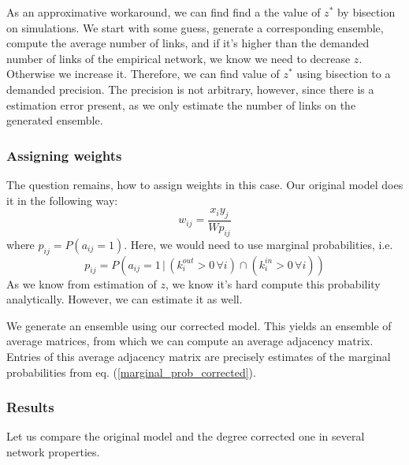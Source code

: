 \documentclass{article}
\begin{document}
As an approximative workaround, we can find find a the value of $z^*$ by bisection on simulations. We start with some guess, generate a corresponding ensemble, compute the average number of links, and if it's higher than the demanded number of links of the empirical network, we know we need to decrease $z$. Otherwise we increase it. Therefore, we can find value of $z^*$ using bisection to a demanded precision. The precision is not arbitrary, however, since there is a estimation error present, as we only estimate the number of links on the generated ensemble.

\subsubsection{Assigning weights}
The question remains, how to assign weights in this case. Our original model does it in the following way:
\begin{equation}
    w_{ij} = \frac{x_iy_j}{Wp_{ij}}
\end{equation}
where $p_{ij} = P(a_{ij} = 1)$. Here, we would need to use marginal probabilities, i.e. 
\begin{equation}
    p_{ij} = P(a_{ij} = 1\, | \, (k_i^{out} > 0 \, \forall i) \cap (k_i^{in} > 0 \, \forall i ))
\label{marginal_prob_corrected}
\end{equation}
As we know from estimation of $z$, we know it's hard compute this probability analytically. However, we can estimate it as well. 

We generate an ensemble using our corrected model. This yields an ensemble of average matrices, from which we can compute an average adjacency matrix. Entries of this average adjacency matrix are precisely estimates of the marginal probabilities from eq. (\ref{marginal_prob_corrected}).

\subsubsection{Results}
Let us compare the original model and the degree corrected one in several network properties.
\end{document}
